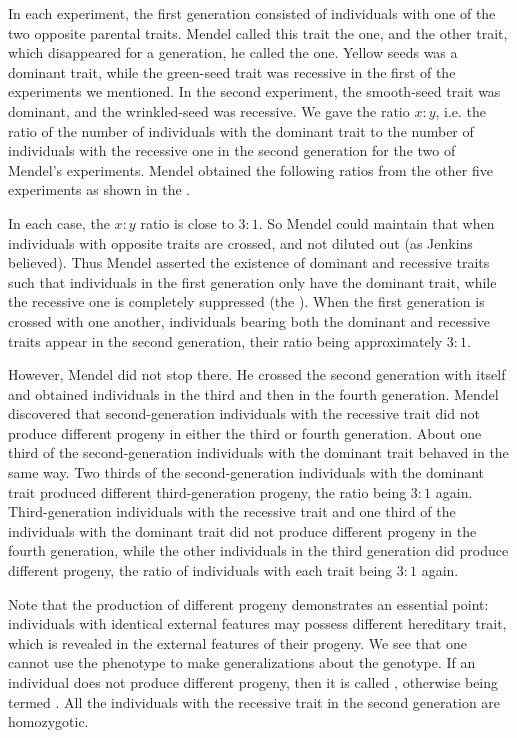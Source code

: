 In each experiment, the first generation consisted of individuals with
one of the two opposite parental traits. Mendel called this trait the
 one, and the other trait, which disappeared for a generation, he called the  one. Yellow seeds was a dominant trait, while the green-seed trait was recessive in the first of the experiments we mentioned. In the second experiment, the smooth-seed trait was dominant, and the wrinkled-seed was recessive. We gave the ratio $x:y$, i.e. the ratio of the number of individuals with the dominant trait to the number of individuals with the recessive one in the second generation for the two of Mendel's experiments. Mendel obtained the following ratios from the other five experiments as shown in the .

In each case, the $x:y$ ratio is close to $3:1$. So Mendel could maintain
that when individuals with opposite traits are crossed,  and not diluted out (as Jenkins believed). Thus
Mendel asserted the existence of dominant and recessive traits such that
individuals in the first generation only have the dominant trait, while
the recessive one is completely suppressed (the ). When the first generation is crossed with one
another, individuals bearing both the dominant and recessive traits
appear in the second generation, their ratio being approximately $3:1$.

However, Mendel did not stop there. He crossed the second
generation with itself and obtained individuals in the third and then in
the fourth generation. Mendel discovered that second-generation
individuals with the recessive trait did not produce different progeny in
either the third or fourth generation. About one third of the
second-generation individuals with the dominant trait behaved in the
same way. Two thirds of the second-generation individuals with the
dominant trait produced different third-generation progeny, the ratio
being $3:1$ again. Third-generation individuals with the recessive trait
and one third of the individuals with the dominant trait did not produce
different progeny in the fourth generation, while the other individuals in
the third generation did produce different progeny, the ratio of
individuals with each trait being $3:1$ again.


Note that the production of different progeny demonstrates an
essential point: individuals with identical external features may possess
different hereditary trait, which is revealed in the external features of
their progeny. We see that one cannot use the phenotype to make
generalizations about the genotype. If an individual does not produce
different progeny, then it is called , otherwise being termed . All the individuals with the recessive trait in the second generation are homozygotic.

